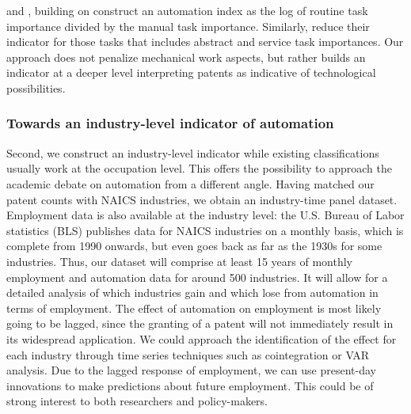\documentclass[11pt,a4paper,fleqn]{article}
\begin{document}
\cite{AKK2008} and \cite{AD2013}, building on \cite{ALM2003} construct an automation index as the log of routine task importance divided by the manual task importance. Similarly, \cite{GMS2014} reduce their indicator for those tasks that includes abstract and service task importances. Our approach does not penalize mechanical work aspects, but rather builds an indicator at a deeper level interpreting patents as indicative of technological possibilities.


\subsubsection*{Towards an industry-level indicator of automation}
Second, we construct an industry-level indicator while existing classifications usually work at the occupation level. This offers the possibility to approach the academic debate on automation from a different angle. Having matched our patent counts with NAICS industries, we obtain an industry-time panel dataset. Employment data is also available at the industry level: the U.S. Bureau of Labor statistics (BLS) publishes data for NAICS industries on a monthly basis, which is complete from 1990 onwards, but even goes back as far as the 1930s for some industries. Thus, our dataset will comprise at least 15 years of monthly employment and automation data for around 500 industries. It will allow for a detailed analysis of which industries gain and which lose from automation in terms of employment. The effect of automation on employment is most likely going to be lagged, since the granting of a patent will not immediately result in its widespread application. We could approach the identification of the effect for each industry through time series techniques such as cointegration or VAR analysis. Due to the lagged response of employment, we can use present-day innovations to make predictions about future employment. This could be of strong interest to both researchers and policy-makers.
\end{document}
